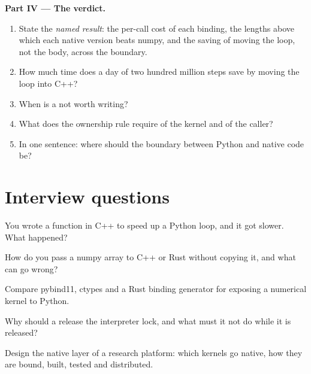 \begin{problem}
\medskip\noindent\textbf{Part IV --- The verdict.}
\begin{enumerate}[resume]
\item State the \emph{named result}: the per-call cost of each binding, the lengths above which each native version beats numpy, and the
saving of moving the loop, not the body, across the boundary.
\item How much time does a day of two hundred million steps save by moving the loop into C++?
\item When is a  not worth writing?
\item What does the ownership rule require of the kernel and of the caller?
\item In one sentence: where should the boundary between Python and native code be?
\end{enumerate}
\end{problem}

\section{Interview questions}

\begin{interviewq}\label{iq:pl:native-extensions:1}
You wrote a function in C++ to speed up a Python loop, and it got slower. What happened?
\end{interviewq}

\begin{interviewq}\label{iq:pl:native-extensions:2}
How do you pass a numpy array to C++ or Rust without copying it, and what can go wrong?
\end{interviewq}

\begin{interviewq}\label{iq:pl:native-extensions:3}
Compare pybind11, ctypes and a Rust binding generator for exposing a numerical kernel to Python.
\end{interviewq}

\begin{interviewq}\label{iq:pl:native-extensions:4}
Why should a  release the interpreter lock, and what must it not do while it is released?
\end{interviewq}

\begin{interviewq}\label{iq:pl:native-extensions:5}
Design the native layer of a research platform: which kernels go native, how they are bound, built, tested and distributed.
\end{interviewq}
